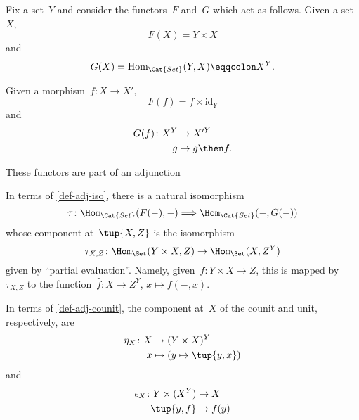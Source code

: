 Fix a set~$Y$ and consider the functors~$F$ and~$G$ which act as follows. Given a set~$X$, 
\begin{equation*}
F(X) = Y \times X
\end{equation*}
and 
\begin{equation*}
G(X) = \text{Hom}_{\Cat{Set}}(Y, X) \eqqcolon X^Y.
\end{equation*}

Given a morphism~$f\colon X \to X'$, 
\begin{equation*}
F(f) = f \times \text{id}_Y
\end{equation*}
and 
\begin{equation*}
\begin{aligned}
G(f)\colon X^Y &\to X'^Y\\
g &\mapsto g \then f.
\end{aligned}
\end{equation*}

These functors are part of an adjunction

\begin{center}
\end{center}
In terms of \cref{def-adj-iso}, there is a natural isomorphism 
\begin{equation*}
\tau\colon \Hom_{\Cat{Set}}(F(- ), - )  \Longrightarrow  \Hom_{\Cat{Set}}(- , G( - ))
\end{equation*}
whose component at~$\tup{X,Z}$ is the isomorphism 
\begin{equation*}
\tau_{X,Z} \colon \Hom_{\Set}(Y \times X, Z) \to \Hom_{\Set}(X, Z^Y)
\end{equation*}
given by ``partial evaluation''. Namely, given~$f\colon Y \times X \to Z$,  this is mapped by~$\tau_{X,Z}$ to the function~$\hat f\colon X \to Z^Y$, $x \mapsto f( -, x)$. 

In terms of \cref{def-adj-counit}, the component at~$X$ of the counit and unit, respectively, are
\begin{equation*}
    \begin{aligned}
    \eta_X \colon X &\to  (Y \times X)^Y\\
    x &\mapsto (y \mapsto \tup{y,x})
    \end{aligned}
\end{equation*}
and
\begin{equation*}
    \begin{aligned}
    \epsilon_X \colon Y \times (X^Y) &\to X\\
    \tup{y,f} &\mapsto f(y)
    \end{aligned}
\end{equation*}


